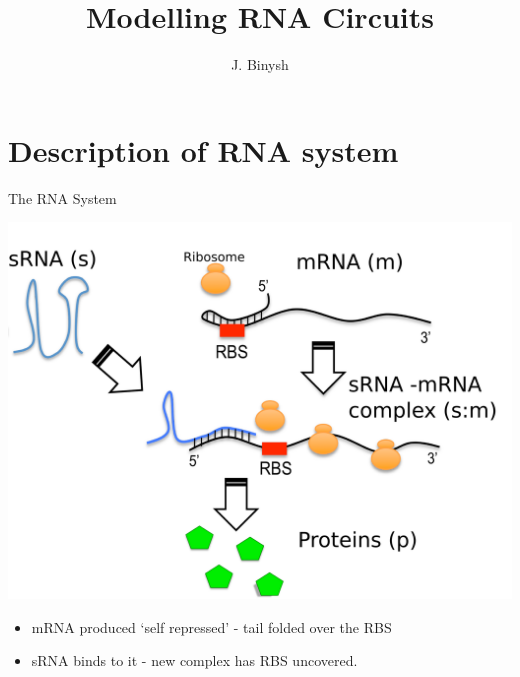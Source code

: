 \documentclass{beamer}
\title %
{Modelling RNA Circuits}
\subtitle
{}
\author %
{J. Binysh\inst{1}}
\institute[University of Warwick] %
{
  \inst{1}%
 	Centre for Complexity Science\\
  University of Warwick
 }
\begin{document}
\begin{frame}
  \titlepage
\end{frame}





\section{Description of RNA system}

\begin{frame}{The RNA System}{}
  \begin{center}
  \includegraphics[trim = 0 0 0 30,clip = true,scale = 0.275]{Figures/schematic_initial.png}
  \end{center}

  \begin{itemize}
    \item  mRNA produced `self repressed'  - tail folded over the RBS
    \item  sRNA binds to it - new complex has RBS uncovered.
    \end{itemize}
\end{frame}
\end{document}
